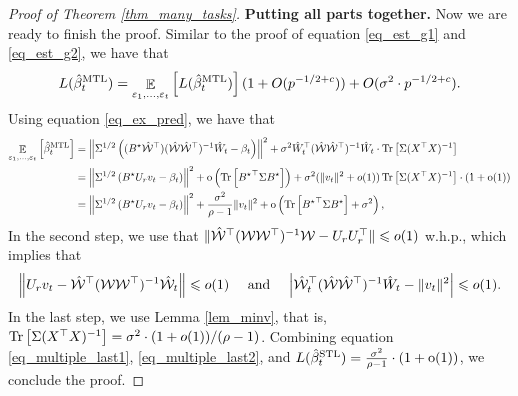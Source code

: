 \begin{proof}[Proof of Theorem \ref{thm_many_tasks}]
	\medskip
	\noindent\textbf{Putting all parts together.}
	Now we are ready to finish the proof.
	Similar to the proof of equation \eqref{eq_est_g1} and \eqref{eq_est_g2}, we have that
	\begin{align}
		L(\hat{\beta}_t^{\textup{MTL}}) = \mathop{\mathbb{E}}_{\varepsilon_1, \dots, \varepsilon_t}\left[ L(\hat{\beta}_t^{\textup{MTL}}) \right] (1 + O(p^{-1/2+c})) + O(\sigma^2 \cdot p^{-1/2 + c}). \label{eq_multiple_last1}
	\end{align}
	Using equation \eqref{eq_ex_pred}, we have that
	\begin{align}
		\mathop{\mathbb{E}}_{\varepsilon_1, \dots, \varepsilon_t}\left[ \hat{\beta}_t^{\textup{MTL}} \right] &= \left\| \Sigma^{1/2} \left((B^\star \hat{\mathcal W}^\top) (\hat{\mathcal W}\hat{\mathcal W}^{\top})^{-1} \hat W_t - \beta_t \right)  \right\|^2
		+ \sigma^2  \hat W_t^{\top} (\hat{\mathcal W}\hat{\mathcal W}^{\top})^{-1} \hat W_t \cdot \operatorname{Tr}\left[\Sigma (X^{\top}X)^{-1}\right] \nonumber \\
		&= \left\| \Sigma^{1/2} \left({B^{\star} U_r v_t-\beta_t}\right) \right\|^2 + \operatorname{o}\left(\operatorname{Tr}\left[{B^{\star}}^{\top} \Sigma B^{\star}\right]\right) + \sigma^2(\|v_t\|^2 + o(1)) \operatorname{Tr}\left[\Sigma (X^{\top}X)^{-1}\right] \cdot (1+\operatorname{o}(1)) \nonumber \\
		&= \left\| \Sigma^{1/2} \left({B^{\star} U_r v_t-\beta_t}\right) \right\|^2 + \frac{\sigma^2}{\rho-1}\|v_t\|^2 + \operatorname{o} \left( \operatorname{Tr}\left[{B^{\star}}^{\top} \Sigma B^{\star}\right] + \sigma^2\right), \label{eq_multiple_last2}
	\end{align}
	In the second step, we use that $\|\hat{{\mathcal W}}^{\top} ({\mathcal W} {\mathcal W}^{\top})^{-1} {\mathcal W} - U_r U_r^{\top}\| \leqslant o(1)$ w.h.p., which implies that
	\[ \left\| U_r v_t - \hat{{\mathcal W}}^{\top} ({\mathcal W} {\mathcal W}^{\top})^{-1} \hat{{\mathcal W}}_t \right\| \leqslant o(1) \quad \text{ and } \quad {\left| {\hat{{\mathcal W}}_t^{\top} (\hat{{\mathcal W}} \hat{{\mathcal W}}^{\top})^{-1} \hat{W}_t - \|v_t\|^2} \right|} \leqslant o(1). \]
  In the last step, we use Lemma \ref{lem_minv}, that is, $\operatorname{Tr}\left[\Sigma (X^{\top} X)^{-1}\right] = \sigma^2 \cdot (1 + o(1))/ (\rho - 1)$.
	Combining equation \eqref{eq_multiple_last1}, \eqref{eq_multiple_last2}, and $L(\hat{\beta}_t^{\textup{STL}})=\frac{\sigma^2}{\rho-1} \cdot \left( 1+\operatorname{o}(1)\right)$, we conclude the proof.
\end{proof}
